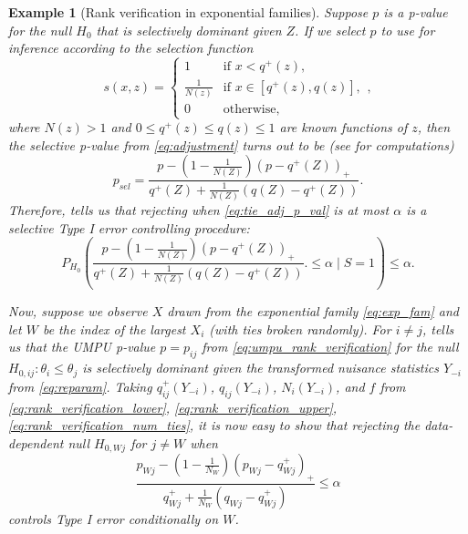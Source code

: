 \documentclass{article}
\newtheorem{example}{Example}
\begin{document}
\begin{appendix}
\begin{example}[Rank verification in exponential families]
    \label{exm:rank_verification_exp_fam}
    Suppose $p$ is a p-value for the null $H_0$ that is selectively dominant given $Z$. If we select $p$ to use for inference according to the selection function 
    \begin{equation*}
        s(x, z) = 
        \begin{cases} 
        1 & \text{if } x < q^+(z), \\
        \frac{1}{N(z)} & \text{if } x \in [q^+(z), q(z)], \\
        0 & \text{otherwise},
        \end{cases},
    \end{equation*}
    where $N(z)> 1$ and $0 \leq q^{+}(z) \leq q(z) \leq 1$ are known functions of $z$, then the selective p-value from \eqref{eq:adjustment} turns out to be (see  for computations)
    \begin{equation}
            \label{eq:tie_adj_p_val}
            p_{sel} = \frac{p - (1-\frac{1}{N(Z)})(p - q^+(Z))_+ }{q^+(Z) + \frac{1}{N(Z)}(q(Z) - q^+(Z))}.
     \end{equation}
    Therefore,  tells us that rejecting when \eqref{eq:tie_adj_p_val} is at most $\alpha$ is a selective Type I error controlling procedure:
    \begin{equation}
        \label{eq:tie_tool}
        P_{H_0}\left( \frac{p - (1-\frac{1}{N(Z)})(p - q^+(Z))_+ }{q^+(Z) + \frac{1}{N(Z)}(q(Z) - q^+(Z))}.  \leq \alpha \mid S = 1\right) \leq \alpha.  
    \end{equation} 
    
    Now, suppose we observe $X$ drawn from the exponential family \eqref{eq:exp_fam} and let $W$ be the index of the largest $X_i$ (with ties broken randomly). For $i \neq j$,  tells us that the UMPU p-value $p = p_{ij}$ from \eqref{eq:umpu_rank_verification} for the null $H_{0, ij}: \theta_i \leq \theta_j $ is selectively dominant given the transformed nuisance statistics $Y_{-i}$ from \eqref{eq:reparam}. Taking $q_{ij}^+(Y_{-i})$, $q_{ij}(Y_{-i})$, $N_i(Y_{-i})$, and $f$ from  \eqref{eq:rank_verification_lower}, \eqref{eq:rank_verification_upper}, \eqref{eq:rank_verification_num_ties}, it is now easy to show that rejecting the data-dependent null $H_{0, Wj}$ for $j \neq W$ when 
    \begin{equation}
      \frac{p_{Wj} - (1-\frac{1}{N_W})(p_{Wj} - q_{Wj}^+)_+ }{q_{Wj}^+ + \frac{1}{N_W}(q_{Wj} - q^+_{Wj})} \leq \alpha
    \end{equation} 
    controls Type I error conditionally on $W$. 
    

\end{example}
\end{appendix}
\end{document}
